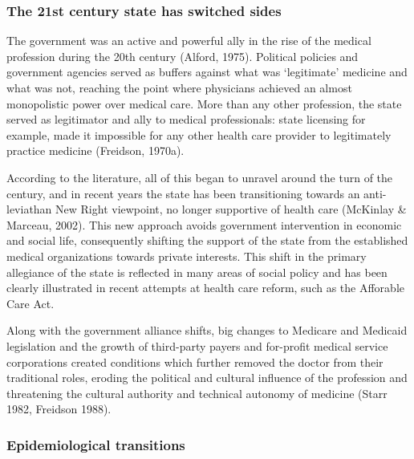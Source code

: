 \documentclass[12pt,twoside]{reedthesis}
\begin{document}
  \subsubsection*{The 21st century state has switched
  sides}\label{the-21st-century-state-has-switched-sides}
  
  The government was an active and powerful ally in the rise of the
  medical profession during the 20th century (Alford, 1975). Political
  policies and government agencies served as buffers against what was
  `legitimate' medicine and what was not, reaching the point where
  physicians achieved an almost monopolistic power over medical care. More
  than any other profession, the state served as legitimator and ally to
  medical professionals: state licensing for example, made it impossible
  for any other health care provider to legitimately practice medicine
  (Freidson, 1970a).
  
  According to the literature, all of this began to unravel around the
  turn of the century, and in recent years the state has been
  transitioning towards an anti-leviathan New Right viewpoint, no longer
  supportive of health care (McKinlay \& Marceau, 2002). This new approach
  avoids government intervention in economic and social life, consequently
  shifting the support of the state from the established medical
  organizations towards private interests. This shift in the primary
  allegiance of the state is reflected in many areas of social policy and
  has been clearly illustrated in recent attempts at health care reform,
  such as the Afforable Care Act.
  
  Along with the government alliance shifts, big changes to Medicare and
  Medicaid legislation and the growth of third-party payers and for-profit
  medical service corporations created conditions which further removed
  the doctor from their traditional roles, eroding the political and
  cultural influence of the profession and threatening the cultural
  authority and technical autonomy of medicine (Starr 1982, Freidson
  1988).
  
  \subsubsection*{Epidemiological
  transitions}\label{epidemiological-transitions}
  
\end{document}
